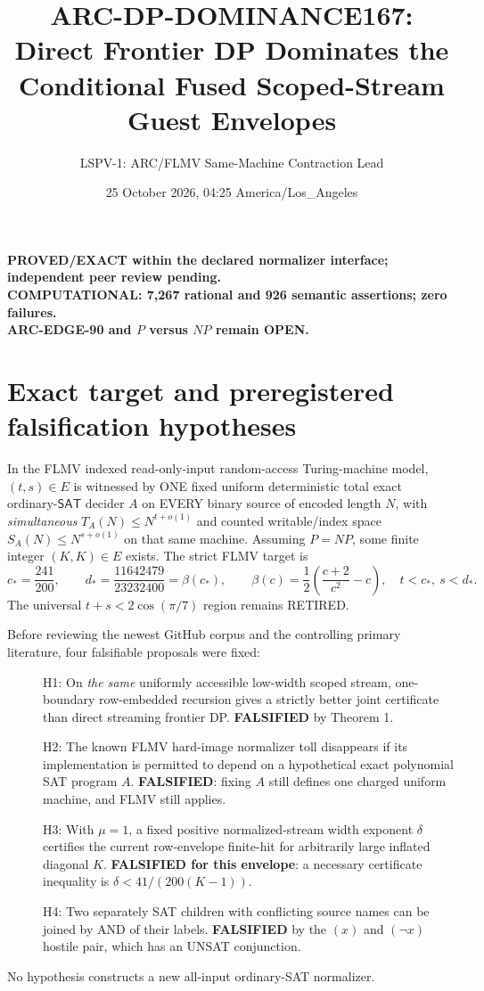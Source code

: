 \documentclass[11pt]{article}
\title{ARC-DP-DOMINANCE167:\\
\large Direct Frontier DP Dominates the Conditional Fused Scoped-Stream Guest Envelopes}
\author{LSPV-1: ARC/FLMV Same-Machine Contraction Lead}
\date{25 October 2026, 04:25 America/Los\_Angeles}
\newcommand{\SAT}{\mathsf{SAT}}
\begin{document}
\maketitle
\begin{center}
\textbf{PROVED/EXACT within the declared normalizer interface; independent peer review pending.}\\
\textbf{COMPUTATIONAL: 7,267 rational and 926 semantic assertions; zero failures.}\\
\textbf{ARC-EDGE-90 and $P$ versus $NP$ remain OPEN.}
\end{center}

\section{Exact target and preregistered falsification hypotheses}
In the FLMV indexed read-only-input random-access Turing-machine model,
$(t,s)\in E$ is witnessed by ONE fixed uniform deterministic total exact
ordinary-$\SAT$ decider $A$ on EVERY binary source of encoded length $N$,
with \emph{simultaneous} $T_A(N)\le N^{t+o(1)}$ and counted writable/index
space $S_A(N)\le N^{s+o(1)}$ on that same machine. Assuming $P=NP$, some
finite integer $(K,K)\in E$ exists. The strict FLMV target is
\[
 c_*=\frac{241}{200},\qquad d_*=\frac{11642479}{23232400}
 =\beta(c_*),\qquad
 \beta(c)=\frac12\left(\frac{c+2}{c^2}-c\right),\quad
 t<c_*,\ s<d_*.
\]
The universal $t+s<2\cos(\pi/7)$ region remains RETIRED.

Before reviewing the newest GitHub corpus and the controlling primary
literature, four falsifiable proposals were fixed:
\begin{description}
\item[] H1: On \emph{the same} uniformly accessible low-width scoped stream,
one-boundary row-embedded recursion gives a strictly better joint certificate
than direct streaming frontier DP. \textbf{FALSIFIED} by Theorem 1.
\item[] H2: The known FLMV hard-image normalizer toll disappears if its
implementation is permitted to depend on a hypothetical exact polynomial
SAT program $A$. \textbf{FALSIFIED}: fixing $A$ still defines one charged
uniform machine, and FLMV still applies.
\item[] H3: With $\mu=1$, a fixed positive normalized-stream width exponent
$\delta$ certifies the current row-envelope finite-hit for arbitrarily
large inflated diagonal $K$. \textbf{FALSIFIED for this envelope}:
a necessary certificate inequality is $\delta<41/(200(K-1))$.
\item[] H4: Two separately SAT children with conflicting source names can
be joined by AND of their labels. \textbf{FALSIFIED} by the $(x)$ and
$(\neg x)$ hostile pair, which has an UNSAT conjunction.
\end{description}
No hypothesis constructs a new all-input ordinary-SAT normalizer.
\end{document}
